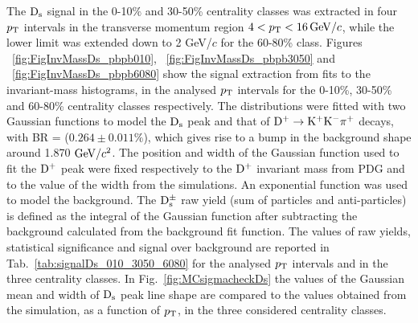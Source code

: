  The ${\rm D_s}$ signal in the 0-10$\%$ and 30-50\% centrality classes was extracted in four $p_{\rm T}$ 
 intervals in the transverse momentum region $4 < p_{\rm T} <16 \, \mathrm{GeV}/c$, while the lower limit was extended down to 2 GeV/$c$
for the 60-80\% class. Figures ~\ref{fig:FigInvMassDs_pbpb010}, ~\ref{fig:FigInvMassDs_pbpb3050} and ~\ref{fig:FigInvMassDs_pbpb6080} show the signal extraction
from fits to the invariant-mass histograms, in the analysed $p_{\rm T}$ intervals
for the 0-10\%, 30-50\% and 60-80\% centrality classes respectively.
The distributions were fitted with two Gaussian functions to model
the ${\rm D_s}$ peak and that of ${\rm D^{+}\to K^+ K^-\pi^+}$ decays, with BR = ($0.264 \pm 0.011\%$),
which gives rise to a bump in the background shape around 1.870 $\mathrm{GeV}/c^{2}$. 
The position and width of the Gaussian function used to fit the ${\rm D^+}$ peak 
were fixed respectively to the ${\rm D^+}$ invariant mass from PDG and to the value of the width from the simulations.
An exponential function was used to model the background.
The ${\rm D_s^{\pm}}$ raw yield (sum of particles and anti-particles) is defined as the integral of the Gaussian function 
after subtracting the background calculated from the 
background fit function. 
The values of raw yields, statistical significance and signal over background are reported in
Tab.~\ref{tab:signalDs_010_3050_6080} for the analysed $p_{\rm T}$ intervals and in the three centrality classes.
In Fig.~\ref{fig:MCsigmacheckDs} the values of the Gaussian mean and width of ${\rm D_s}$ 
peak line shape are compared to the values obtained from the simulation, as a function of $p_{\rm T}$, in the 
three considered centrality classes.

